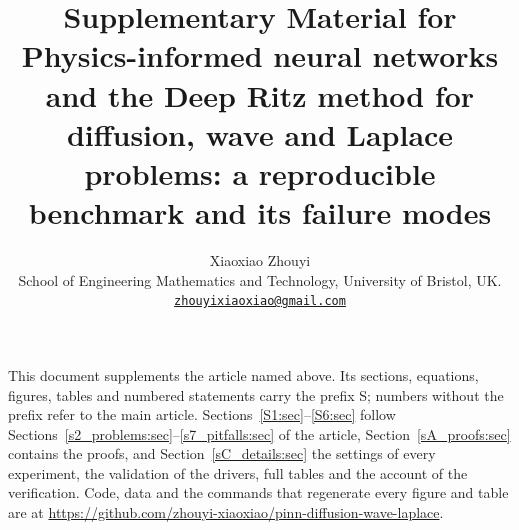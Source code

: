 \documentclass[11pt,a4paper]{article}
\title{Supplementary Material for\\[0.3em]
\large Physics-informed neural networks and the Deep Ritz method for diffusion, wave and
Laplace problems: a reproducible benchmark and its failure modes}
\author{Xiaoxiao Zhouyi\\[0.4em]
\small School of Engineering Mathematics and Technology, University of Bristol, UK.\\
\small \href{mailto:zhouyixiaoxiao@gmail.com}{\texttt{zhouyixiaoxiao@gmail.com}}}
\date{}
\begin{document}
\maketitle

\noindent This document supplements the article named above. Its sections, equations, figures,
tables and numbered statements carry the prefix S; numbers without the prefix refer to the main
article. Sections~\ref{S1:sec}--\ref{S6:sec} follow Sections~\ref{s2_problems:sec}--\ref{s7_pitfalls:sec}
of the article, Section~\ref{sA_proofs:sec} contains the proofs, and Section~\ref{sC_details:sec}
the settings of every experiment, the validation of the drivers, full tables and the account of
the verification. Code, data and the commands that regenerate every figure and table are at
\url{https://github.com/zhouyi-xiaoxiao/pinn-diffusion-wave-laplace}.

\tableofcontents












\end{document}
